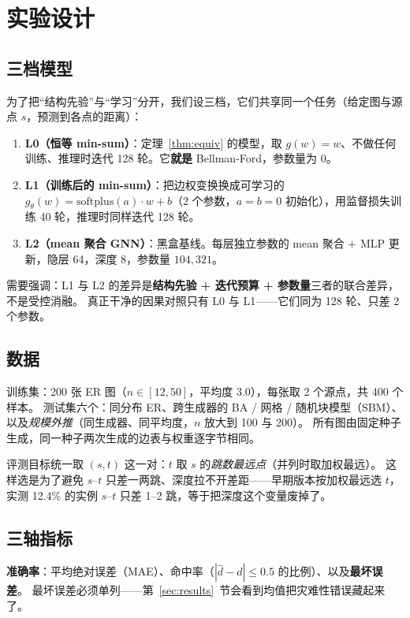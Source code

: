 \section{实验设计}\label{sec:setup}

\subsection{三档模型}

为了把“结构先验”与“学习”分开，我们设三档，它们共享同一个任务（给定图与源点 $s$，预测到各点的距离）：

\begin{enumerate}[leftmargin=1.8em]
\item \textbf{L0（恒等 min-sum）}：定理~\ref{thm:equiv} 的模型，取 $g(w)=w$、不做任何训练、推理时迭代 128 轮。它\textbf{就是} Bellman-Ford，参数量为 0。
\item \textbf{L1（训练后的 min-sum）}：把边权变换换成可学习的 $g_\theta(w)=\mathrm{softplus}(a)\cdot w+b$（2 个参数，$a=b=0$ 初始化），用监督损失训练 40 轮，推理时同样迭代 128 轮。
\item \textbf{L2（mean 聚合 GNN）}：黑盒基线。每层独立参数的 mean 聚合 + MLP 更新，隐层 64，深度 8，参数量 $104{,}321$。
\end{enumerate}

需要强调：L1 与 L2 的差异是\textbf{结构先验 + 迭代预算 + 参数量}三者的联合差异，不是受控消融。
真正干净的因果对照只有 L0 与 L1——它们同为 128 轮、只差 2 个参数。

\subsection{数据}

训练集：200 张 ER 图（$n\in[12,50]$，平均度 3.0），每张取 2 个源点，共 400 个样本。
测试集六个：同分布 ER、跨生成器的 BA / 网格 / 随机块模型（SBM）、以及\emph{规模外推}（同生成器、同平均度，$n$ 放大到 100 与 200）。
所有图由固定种子生成，同一种子两次生成的边表与权重逐字节相同。

评测目标统一取 $(s,t)$ 这一对：$t$ 取 $s$ 的\emph{跳数最远点}（并列时取加权最远）。
这样选是为了避免 $s$--$t$ 只差一两跳、深度拉不开差距——早期版本按加权最远选 $t$，实测 12.4\% 的实例 $s$--$t$ 只差 1--2 跳，等于把深度这个变量废掉了。

\subsection{三轴指标}

\textbf{准确率}：平均绝对误差（MAE）、命中率（$|\hat d-d|\le0.5$ 的比例）、以及\textbf{最坏误差}。
最坏误差必须单列——第~\ref{sec:results}~节会看到均值把灾难性错误藏起来了。

